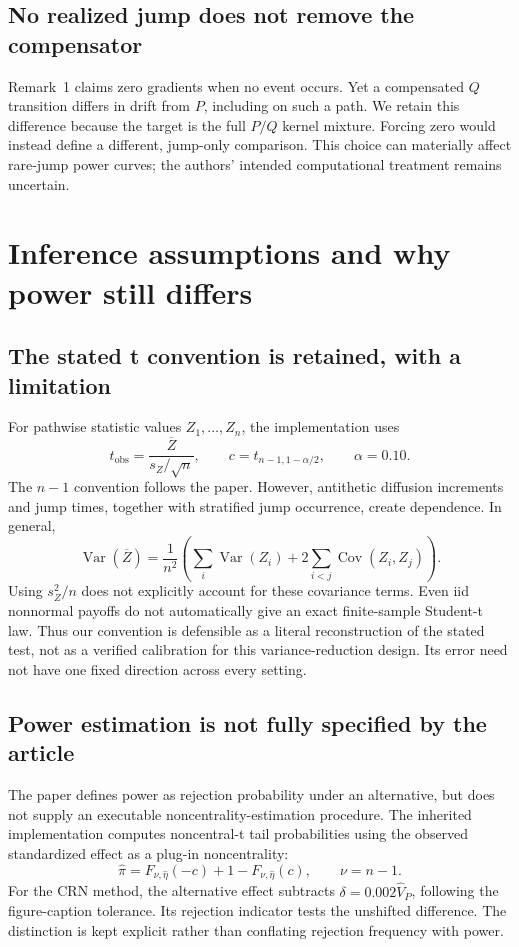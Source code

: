 \documentclass[11pt,a4paper]{article}
\newcommand{\Var}{\operatorname{Var}}
\begin{document}
\subsection{No realized jump does not remove the compensator}
Remark~1 claims zero gradients when no event occurs. Yet a compensated
$Q$ transition differs in drift from $P$, including on such a path.
We retain this difference because the target is the full $P/Q$ kernel
mixture. Forcing zero would instead define a different, jump-only
comparison. This choice can materially affect rare-jump power curves;
the authors' intended computational treatment remains uncertain.

\clearpage
\section{Inference assumptions and why power still differs}
\subsection{The stated t convention is retained, with a limitation}
For pathwise statistic values $Z_1,\ldots,Z_n$, the implementation uses
\[
t_{\mathrm{obs}}=\frac{\overline Z}{s_Z/\sqrt n},
\qquad c=t_{n-1,1-\alpha/2},\qquad \alpha=0.10.
\]
The $n-1$ convention follows the paper. However, antithetic diffusion
increments and jump times, together with stratified jump occurrence,
create dependence. In general,
\[
\Var(\overline Z)=\frac{1}{n^2}
\left(\sum_i\Var(Z_i)+2\sum_{i<j}\operatorname{Cov}(Z_i,Z_j)\right).
\]
Using $s_Z^2/n$ does not explicitly account for these covariance terms.
Even iid nonnormal payoffs do not automatically give an exact
finite-sample Student-t law. Thus our convention is defensible as a
literal reconstruction of the stated test, not as a verified calibration
for this variance-reduction design. Its error need not have one fixed
direction across every setting.

\subsection{Power estimation is not fully specified by the article}
The paper defines power as rejection probability under an alternative,
but does not supply an executable noncentrality-estimation procedure.
The inherited implementation computes noncentral-t tail probabilities
using the observed standardized effect as a plug-in noncentrality:
\[
\widehat\pi=F_{\nu,\widehat\eta}(-c)
+1-F_{\nu,\widehat\eta}(c),\qquad \nu=n-1.
\]
For the CRN method, the alternative effect subtracts
$\delta=0.002\widehat V_P$, following the figure-caption tolerance.
Its rejection indicator tests the unshifted difference. The distinction
is kept explicit rather than conflating rejection frequency with power.
\end{document}
